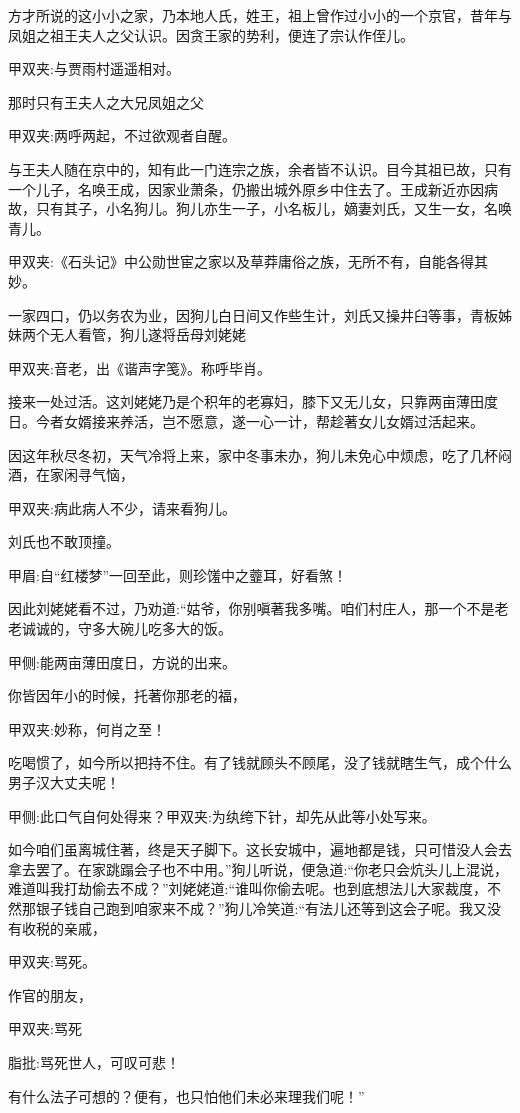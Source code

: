 \begin{parag}
    方才所说的这小小之家，乃本地人氏，姓王，祖上曾作过小小的一个京官，昔年与凤姐之祖王夫人之父认识。因贪王家的势利，便连了宗认作侄儿。\begin{note}甲双夹:与贾雨村遥遥相对。\end{note}那时只有王夫人之大兄凤姐之父\begin{note}甲双夹:两呼两起，不过欲观者自醒。\end{note}与王夫人随在京中的，知有此一门连宗之族，余者皆不认识。目今其祖已故，只有一个儿子，名唤王成，因家业萧条，仍搬出城外原乡中住去了。王成新近亦因病故，只有其子，小名狗儿。狗儿亦生一子，小名板儿，嫡妻刘氏，又生一女，名唤青儿。\begin{note}甲双夹:《石头记》中公勋世宦之家以及草莽庸俗之族，无所不有，自能各得其妙。\end{note}一家四口，仍以务农为业，因狗儿白日间又作些生计，刘氏又操井臼等事，青板姊妹两个无人看管，狗儿遂将岳母刘姥姥\begin{note}甲双夹:音老，出《谐声字笺》。称呼毕肖。\end{note}接来一处过活。这刘姥姥乃是个积年的老寡妇，膝下又无儿女，只靠两亩薄田度日。今者女婿接来养活，岂不愿意，遂一心一计，帮趁著女儿女婿过活起来。
\end{parag}


\begin{parag}
    因这年秋尽冬初，天气冷将上来，家中冬事未办，狗儿未免心中烦虑，吃了几杯闷酒，在家闲寻气恼，\begin{note}甲双夹:病此病人不少，请来看狗儿。\end{note}刘氏也不敢顶撞。\begin{note}甲眉:自“红楼梦”一回至此，则珍馐中之虀耳，好看煞！\end{note}因此刘姥姥看不过，乃劝道:“姑爷，你别嗔著我多嘴。咱们村庄人，那一个不是老老诚诚的，守多大碗儿吃多大的饭。\begin{note}甲侧:能两亩薄田度日，方说的出来。\end{note}你皆因年小的时候，托著你那老的福，\begin{note}甲双夹:妙称，何肖之至！\end{note}吃喝惯了，如今所以把持不住。有了钱就顾头不顾尾，没了钱就瞎生气，成个什么男子汉大丈夫呢！\begin{note}甲侧:此口气自何处得来？甲双夹:为纨绔下针，却先从此等小处写来。\end{note}如今咱们虽离城住著，终是天子脚下。这长安城中，遍地都是钱，只可惜没人会去拿去罢了。在家跳蹋会子也不中用。”狗儿听说，便急道:“你老只会炕头儿上混说，难道叫我打劫偷去不成？”刘姥姥道:“谁叫你偷去呢。也到底想法儿大家裁度，不然那银子钱自己跑到咱家来不成？”狗儿冷笑道:“有法儿还等到这会子呢。我又没有收税的亲戚，\begin{note}甲双夹:骂死。\end{note}作官的朋友，\begin{note}甲双夹:骂死\end{note}\begin{note}脂批:骂死世人，可叹可悲！\end{note}有什么法子可想的？便有，也只怕他们未必来理我们呢！”
\end{parag}


